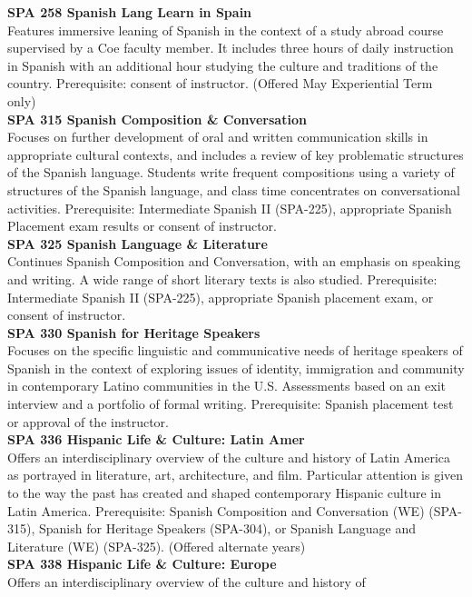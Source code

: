 \documentclass[
  letterpaper,
]{scrbook}
\begin{document}
\textbf{SPA 258 Spanish Lang Learn in Spain}\\
Features immersive leaning of Spanish in the context of a study abroad
course supervised by a Coe faculty member. It includes three hours of
daily instruction in Spanish with an additional hour studying the
culture and traditions of the country. Prerequisite: consent of
instructor. (Offered May Experiential Term only)\\
\textbf{SPA 315 Spanish Composition \& Conversation}\\
Focuses on further development of oral and written communication skills
in appropriate cultural contexts, and includes a review of key
problematic structures of the Spanish language. Students write frequent
compositions using a variety of structures of the Spanish language, and
class time concentrates on conversational activities. Prerequisite:
Intermediate Spanish II (SPA-225), appropriate Spanish Placement exam
results or consent of instructor.\\
\textbf{SPA 325 Spanish Language \& Literature}\\
Continues Spanish Composition and Conversation, with an emphasis on
speaking and writing. A wide range of short literary texts is also
studied. Prerequisite: Intermediate Spanish II (SPA-225), appropriate
Spanish placement exam, or consent of instructor.\\
\textbf{SPA 330 Spanish for Heritage Speakers}\\
Focuses on the specific linguistic and communicative needs of heritage
speakers of Spanish in the context of exploring issues of identity,
immigration and community in contemporary Latino communities in the U.S.
Assessments based on an exit interview and a portfolio of formal
writing. Prerequisite: Spanish placement test or approval of the
instructor.\\
\textbf{SPA 336 Hispanic Life \& Culture: Latin Amer}\\
Offers an interdisciplinary overview of the culture and history of Latin
America as portrayed in literature, art, architecture, and film.
Particular attention is given to the way the past has created and shaped
contemporary Hispanic culture in Latin America. Prerequisite: Spanish
Composition and Conversation (WE) (SPA-315), Spanish for Heritage
Speakers (SPA-304), or Spanish Language and Literature (WE) (SPA-325).
(Offered alternate years)\\
\textbf{SPA 338 Hispanic Life \& Culture: Europe}\\
Offers an interdisciplinary overview of the culture and history of
\end{document}
